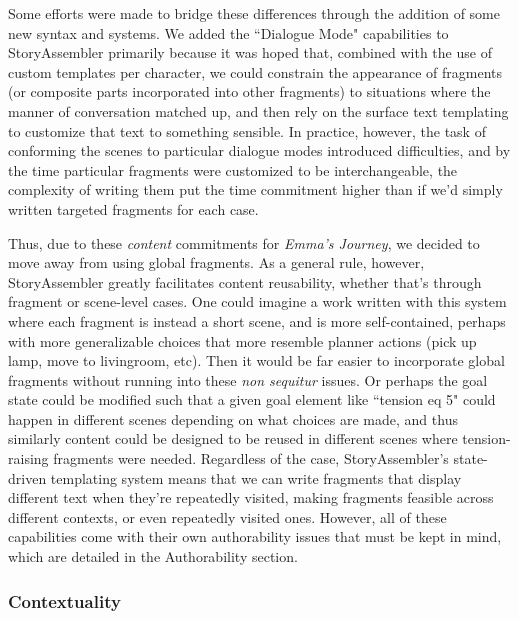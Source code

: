 Some efforts were made to bridge these differences through the addition of some new syntax and systems. We added the ``Dialogue Mode" capabilities to StoryAssembler primarily because it was hoped that, combined with the use of custom templates per character, we could constrain the appearance of fragments (or composite parts incorporated into other fragments) to situations where the manner of conversation matched up, and then rely on the surface text templating to customize that text to something sensible. In practice, however, the task of conforming the scenes to particular dialogue modes introduced difficulties, and by the time particular fragments were customized to be interchangeable, the complexity of writing them put the time commitment higher than if we'd simply written targeted fragments for each case. 

Thus, due to these \textit{content} commitments for \textit{Emma's Journey}, we decided to move away from using global fragments. As a general rule, however, StoryAssembler greatly facilitates content reusability, whether that's through fragment or scene-level cases. One could imagine a work written with this system where each fragment is instead a short scene, and is more self-contained, perhaps with more generalizable choices that more resemble planner actions (pick up lamp, move to livingroom, etc). Then it would be far easier to incorporate global fragments without running into these \textit{non sequitur} issues. Or perhaps the goal state could be modified such that a given goal element like ``tension eq 5" could happen in different scenes depending on what choices are made, and thus similarly content could be designed to be reused in different scenes where tension-raising fragments were needed. Regardless of the case, StoryAssembler's state-driven templating system means that we can write fragments that display different text when they're repeatedly visited, making fragments feasible across different contexts, or even repeatedly visited ones. However, all of these capabilities come with their own authorability issues that must be kept in mind, which are detailed in the Authorability section.

\subsubsection{Contextuality}

